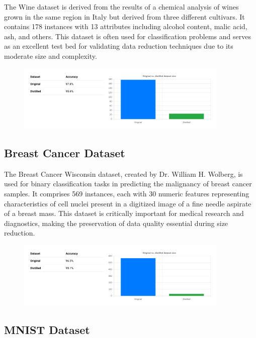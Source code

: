 The Wine dataset is derived from the results of a chemical analysis of wines grown in the same region in Italy but derived from three different cultivars. It contains 178 instances with 13 attributes including alcohol content, malic acid, ash, and others. This dataset is often used for classification problems and serves as an excellent test bed for validating data reduction techniques due to its moderate size and complexity.

\begin{figure}[h]
\includegraphics[width=0.9\textwidth]{images/Wine_validation_test.png}
\centering
\caption{}
\end{figure}

\subsection{Breast Cancer Dataset}

The Breast Cancer Wisconsin dataset, created by Dr. William H. Wolberg, is used for binary classification tasks in predicting the malignancy of breast cancer samples. It comprises 569 instances, each with 30 numeric features representing characteristics of cell nuclei present in a digitized image of a fine needle aspirate of a breast mass. This dataset is critically important for medical research and diagnostics, making the preservation of data quality essential during size reduction.

\begin{figure}[h]
\includegraphics[width=0.9\textwidth]{images/Breast_validation_test.png}
\centering
\caption{}
\end{figure}

\subsection{MNIST Dataset}

